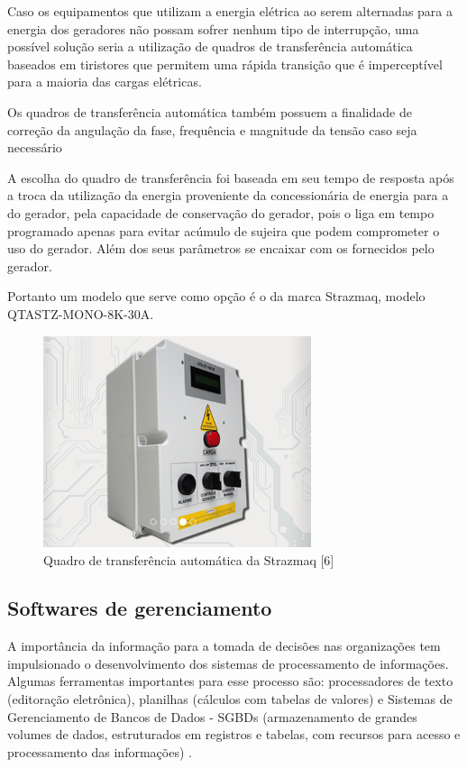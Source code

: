 Caso os equipamentos que utilizam a energia elétrica ao serem alternadas para a energia dos geradores não possam sofrer nenhum tipo de interrupção, uma possível solução seria a utilização de quadros de transferência automática baseados em tiristores que permitem uma rápida transição que é imperceptível para a maioria das cargas elétricas. 

Os quadros de transferência automática também possuem a finalidade de correção da angulação da fase, frequência e magnitude da tensão caso seja necessário

A escolha do quadro de transferência foi baseada em seu tempo de resposta após a troca da utilização da energia proveniente da concessionária de energia para a do gerador, pela capacidade de conservação do gerador, pois o liga em tempo programado apenas para evitar acúmulo de sujeira que podem comprometer o uso do gerador. Além dos seus parâmetros se encaixar com os fornecidos pelo gerador.

Portanto um modelo que serve como opção é o da marca Strazmaq, modelo QTASTZ-MONO-8K-30A.
\begin{figure}[!h]
	\centering
	\includegraphics[width=0.7\textwidth]{figuras/quadroStrazmaq.png}
	\caption{Quadro de transferência automática da Strazmaq [6]}
	\label{fig:geradorbat}
\end{figure}

\subsection{Softwares de gerenciamento}
A importância da informação para a tomada de decisões nas organizações tem impulsionado o desenvolvimento dos sistemas de processamento de informações. Algumas ferramentas importantes para esse processo são: processadores de texto (editoração eletrônica), planilhas (cálculos com tabelas de valores) e Sistemas de Gerenciamento de Bancos de Dados - SGBDs (armazenamento de grandes volumes de dados, estruturados em registros e tabelas, com recursos para acesso e processamento das informações) \cite{rocha2015importancia}.

